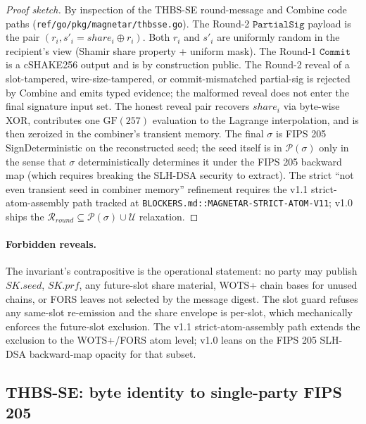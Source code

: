 \begin{proof}[Proof sketch]
By inspection of the THBS-SE round-message and Combine code
paths (\texttt{ref/go/pkg/magnetar/thbsse.go}). The Round-2
$\texttt{PartialSig}$ payload is the pair
$(r_i, s'_i = \mathit{share}_i \oplus r_i)$. Both $r_i$ and
$s'_i$ are uniformly random in the recipient's view (Shamir
share property + uniform mask). The Round-1 $\texttt{Commit}$
is a cSHAKE256 output and is by construction public. The
Round-2 reveal of a slot-tampered, wire-size-tampered, or
commit-mismatched partial-sig is rejected by Combine and emits
typed evidence; the malformed reveal does not enter the final
signature input set. The honest reveal pair recovers
$\mathit{share}_i$ via byte-wise XOR, contributes one
$\mathrm{GF}(257)$ evaluation to the Lagrange interpolation,
and is then zeroized in the combiner's transient memory. The
final $\sigma$ is FIPS 205 SignDeterministic on the
reconstructed seed; the seed itself is in $\mathcal{P}(\sigma)$
only in the sense that $\sigma$ deterministically determines it
under the FIPS 205 backward map (which requires breaking the
SLH-DSA security to extract). The strict ``not even transient
seed in combiner memory'' refinement requires the v1.1
strict-atom-assembly path tracked at
\texttt{BLOCKERS.md::MAGNETAR-STRICT-ATOM-V11}; v1.0 ships the
$\mathcal{R}_{\textit{round}} \subseteq \mathcal{P}(\sigma)
\cup \mathcal{U}$ relaxation.
\end{proof}

\paragraph{Forbidden reveals.} The invariant's contrapositive is
the operational statement: no party may publish
$\mathit{SK.seed}$, $\mathit{SK.prf}$, any future-slot share
material, WOTS+ chain bases for unused chains, or FORS leaves
not selected by the message digest. The slot guard refuses any
same-slot re-emission and the share envelope is per-slot, which
mechanically enforces the future-slot exclusion. The
v1.1 strict-atom-assembly path extends the exclusion to the
WOTS+/FORS atom level; v1.0 leans on the FIPS 205 SLH-DSA
backward-map opacity for that subset.

\subsection{THBS-SE: byte identity to single-party FIPS 205}
\label{sec:security:thbsse-byte-identity}


